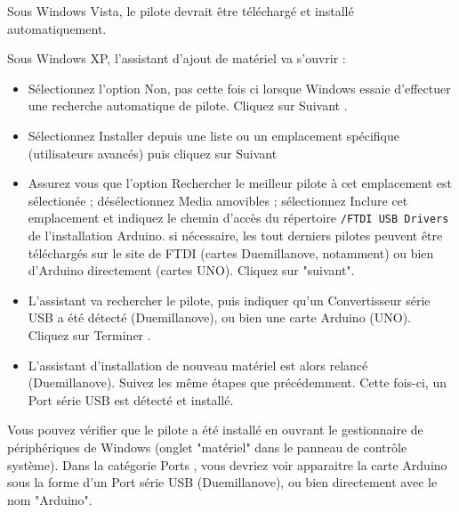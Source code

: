 \documentclass[a4paper,12pt]{article}
\newcommand{\code}[1]{\texttt{#1}}
\begin{document}
Sous Windows Vista, le pilote devrait être téléchargé et installé
automatiquement.

Sous Windows XP, l'assistant d'ajout de matériel va s'ouvrir :

\begin{itemize}
        \item 

		Sélectionnez l'option \og Non, pas cette fois ci \fg lorsque Windows
		essaie d'effectuer une recherche automatique de pilote. Cliquez sur \og
		Suivant \fg.
        
        \item 

		Sélectionnez \og Installer depuis une liste ou un emplacement
		spécifique (utilisateurs avancés) \fg puis cliquez sur \og Suivant \fg


        \item

		Assurez vous que l'option \og Rechercher le meilleur pilote à cet
		emplacement \fg est sélectionée ; désélectionnez \og Media amovibles
		\fg; sélectionnez \og Inclure cet emplacement \fg et indiquez le chemin
		d'accès du répertoire \code{/FTDI USB Drivers} de l'installation
		Arduino.  si nécessaire, les tout derniers pilotes peuvent être
		téléchargés sur le site de FTDI (cartes Duemillanove, notamment) ou
		bien d'Arduino directement (cartes UNO).  Cliquez sur "suivant".
        
        \item

		L'assistant va rechercher le pilote, puis indiquer qu'un \og
		Convertisseur série USB \fg a été détecté (Duemillanove), ou bien une
		carte Arduino (UNO). Cliquez sur \og Terminer \fg.
        
        \item
		L'assistant d'installation de nouveau matériel est alors relancé
		(Duemillanove). Suivez les même étapes que précédemment. Cette fois-ci,
		un \og Port série USB \fg est détecté et installé.

\end{itemize}

Vous pouvez vérifier que le pilote a été installé en ouvrant le gestionnaire de
périphériques de Windows (onglet "matériel" dans le panneau de contrôle
système).  Dans la catégorie \og Ports \fg, vous devriez voir apparaitre la
carte Arduino sous la forme d'un \og Port série USB \fg (Duemillanove), ou bien
directement avec le nom "Arduino".
\end{document}
